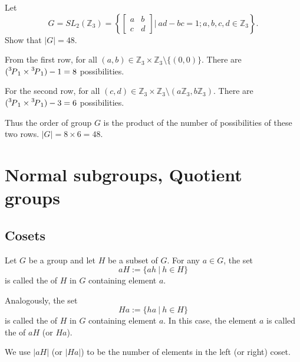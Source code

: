 \begin{example}
    Let 
    \[
        G = SL_2(\mathbb{Z}_3) = \left\{ \begin{bmatrix}
        a & b\\ c & d
        \end{bmatrix} \bigg \vert \> ad-bc = 1; a, b, c, d \in \mathbb{Z}_3 \right\}.
    \]
    Show that $|G| = 48$.
\end{example}
\begin{solution}
    From the first row, for all $(a,b) \in \mathbb{Z}_3 \times \mathbb{Z}_3 \setminus \{ (0,0)\}$. There are 
    $(\perm[3]{1} \times \perm[3]{1}) - 1 = 8$ possibilities.

    For the second row, for all $(c,d) \in \mathbb{Z}_3 \times \mathbb{Z}_3 \setminus (a\mathbb{Z}_3, b\mathbb{Z}_3)$.
    There are $(\perm[3]{1} \times \perm[3]{1}) - 3 = 6$ possibilities.

    Thus the order of group $G$ is the product of the number of possibilities of these two rows. $|G| = 8 \times 6 = 48$.
\end{solution}

\section{Normal subgroups, Quotient groups}

\subsection{Cosets}

\begin{definition}[Cosets]
    Let $G$ be a group and let $H$ be a subset of $G$. For any $a \in G$, the set 
    \[
        aH := \{ ah \> | \> h\in H\}
    \]
    is called the  of $H$ in $G$ containing element $a$. 

    Analogously, the set 
    \[
        Ha := \{ ha \> | \> h\in H\}
    \]
    is called the  of $H$ in $G$ containing element $a$.
    In this case, the element $a$ is called the  of 
    $aH$ (or $Ha$). 

    We use $|aH|$ (or $|Ha|$) to be the number of elements in the left (or right) coset.
\end{definition}

